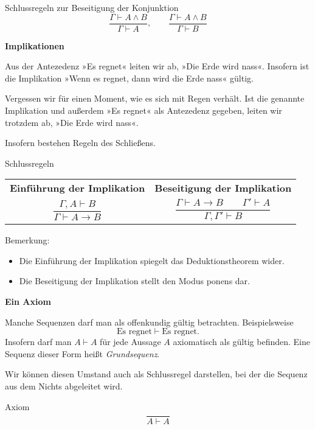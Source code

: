 \documentclass[8pt]{beamer}
\newcommand{\strong}[1]{\textsf{\textbf{#1}}}
\newcommand{\centerheadline}[1]{%
  \begin{center}\strong{#1}\end{center}}
\newcommand{\parspace}{\vspace{0.8em}}
\newcommand{\cond}{\rightarrow}
\begin{document}
\begin{frame}
\begin{block}{Schlussregeln zur Beseitigung der Konjunktion}
\[\dfrac{\Gamma\vdash A\land B}{\Gamma\vdash A},\qquad
\dfrac{\Gamma\vdash A\land B}{\Gamma\vdash B}\]
\end{block}
\end{frame}

\begin{frame}
\centerheadline{Implikationen}
\end{frame}

\begin{frame}
Aus der Antezedenz »Es regnet« leiten wir ab, »Die Erde wird nass«.
Insofern ist die Implikation »Wenn es regnet, dann wird die Erde
nass« gültig.\pause

\parspace
Vergessen wir für einen Moment, wie es sich mit Regen verhält.
Ist die genannte Implikation und außerdem »Es regnet« als
Antezedenz gegeben, leiten wir trotzdem ab, »Die Erde wird nass«.\pause

\parspace
Insofern bestehen Regeln des Schließens.
\begin{block}{Schlussregeln}
\begin{center}
\begin{tabular}{c@{\qquad\quad}c}
\strong{\small Einführung der Implikation}
& \strong{\small Beseitigung der Implikation}\\[6pt]
$\dfrac{\Gamma,A\vdash B}{\Gamma\vdash A\cond B}$
& $\dfrac{\Gamma\vdash A\cond B\qquad\Gamma'\vdash A}{\Gamma,\Gamma'\vdash B}$\\
\end{tabular}
\end{center}
\end{block}\pause

\parspace
Bemerkung:
\begin{itemize}
\item Die Einführung der Implikation spiegelt das Deduktionstheorem wider.
\item Die Beseitigung der Implikation stellt den Modus ponens dar.
\end{itemize}
\end{frame}

\begin{frame}
\centerheadline{Ein Axiom}
\end{frame}

\begin{frame}
Manche Sequenzen darf man als offenkundig gültig betrachten. Beispielsweise
\[\text{Es regnet}\vdash\text{Es regnet}.\]\pause
Insofern darf man $A\vdash A$ für jede Aussage $A$
axiomatisch als gültig befinden. Eine Sequenz dieser Form heißt
\emph{Grundsequenz}.\pause

\parspace
Wir können diesen Umstand auch als Schlussregel darstellen, bei der
die Sequenz aus dem Nichts abgeleitet wird.
\begin{block}{Axiom}
\[\dfrac{}{A\vdash A}\]
\end{block}
\end{frame}
\end{document}
